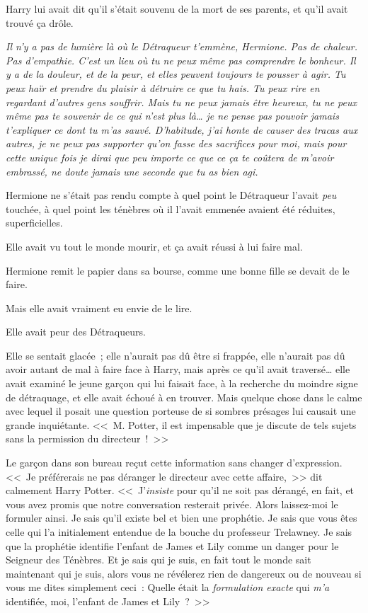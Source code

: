 Harry lui avait dit qu'il s'était souvenu de la mort de ses parents, et qu'il avait trouvé ça drôle.

\emph{Il n'y a pas de lumière là où le Détraqueur t'emmène, Hermione. Pas de chaleur. Pas d'empathie. C'est un lieu où tu ne peux même pas comprendre le bonheur. Il y a de la douleur, et de la peur, et elles peuvent toujours te pousser à agir. Tu peux haïr et prendre du plaisir à détruire ce que tu hais. Tu peux rire en regardant d'autres gens souffrir. Mais tu ne peux jamais être heureux, tu ne peux même pas te souvenir de ce qui n'est plus là… je ne pense pas pouvoir jamais t'expliquer ce dont tu m'as sauvé. D'habitude, j'ai honte de causer des tracas aux autres, je ne peux pas supporter qu'on fasse des sacrifices pour moi, mais pour cette unique fois je dirai que peu importe ce que ce ça te coûtera de m'avoir embrassé, ne doute jamais une seconde que tu as bien agi.}

Hermione ne s'était pas rendu compte à quel point le Détraqueur l'avait \emph{peu} touchée, à quel point les ténèbres où il l'avait emmenée avaient été réduites, superficielles.

Elle avait vu tout le monde mourir, et ça avait réussi à lui faire mal.

Hermione remit le papier dans sa bourse, comme une bonne fille se devait de le faire.

Mais elle avait vraiment eu envie de le lire.

Elle avait peur des Détraqueurs.


Elle se sentait glacée~; elle n'aurait pas dû être si frappée, elle n'aurait pas dû avoir autant de mal à faire face à Harry, mais après ce qu'il avait traversé… elle avait examiné le jeune garçon qui lui faisait face, à la recherche du moindre signe de détraquage, et elle avait échoué à en trouver. Mais quelque chose dans le calme avec lequel il posait une question porteuse de si sombres présages lui causait une grande inquiétante. <<~M. Potter, il est impensable que je discute de tels sujets sans la permission du directeur~!~>>

Le garçon dans son bureau reçut cette information sans changer d'expression. <<~Je préférerais ne pas déranger le directeur avec cette affaire,~>> dit calmement Harry Potter. <<~J'\emph{insiste} pour qu'il ne soit pas dérangé, en fait, et vous avez promis que notre conversation resterait privée. Alors laissez-moi le formuler ainsi. Je sais qu'il existe bel et bien une prophétie. Je sais que vous êtes celle qui l'a initialement entendue de la bouche du professeur Trelawney. Je sais que la prophétie identifie l'enfant de James et Lily comme un danger pour le Seigneur des Ténèbres. Et je sais qui je suis, en fait tout le monde sait maintenant qui je suis, alors vous ne révélerez rien de dangereux ou de nouveau si vous me dites simplement ceci~: Quelle était la \emph{formulation exacte} qui \emph{m'a} identifiée, moi, l'enfant de James et Lily~?~>>

